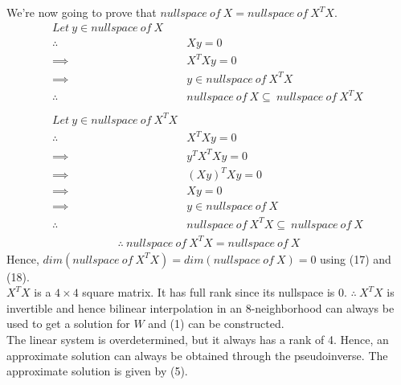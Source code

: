 \documentclass[a4paper,fleqn,11pt]{article}
\theoremstyle{mytheor}
\begin{document}
We're now going to prove that $nullspace\ of\ X = nullspace\ of\ X^TX$.
\begin{align*}
Let\ y \in nullspace\ of\ X \\
\therefore\ & Xy = 0 \\
\implies\ & X^TXy = 0 \\
\implies\ & y \in nullspace\ of\ X^TX \\
\therefore\ & nullspace\ of\ X \subseteq\ nullspace\ of\ X^TX \\
\\
Let\ y \in nullspace\ of\ X^TX \\
\therefore\ & X^TXy = 0 \\
\implies\ & y^TX^TXy = 0 \\
\implies\ & (Xy)^TXy = 0 \\
\implies\ & Xy = 0 \\
\implies\ & y \in nullspace\ of\ X \\
\therefore\ & nullspace\ of\ X^TX \subseteq\ nullspace\ of\ X\
\end{align*}
\begin{align}
\therefore\ nullspace\ of\ X^TX = nullspace\ of\ X
\end{align}
Hence, $dim(nullspace\ of\ X^TX) = dim(nullspace\ of\ X) = 0$ using (17) and (18). \\
$X^TX$ is a $4\times4$ square matrix. It has full rank since its nullspace is 0. $\therefore\ X^TX$ is invertible and hence bilinear interpolation in an 8-neighborhood can always be used to get a solution for $W$ and (1) can be constructed. \\
The linear system is overdetermined, but it always has a rank of 4. Hence, an approximate solution can always be obtained through the pseudoinverse. The approximate solution is given by (5).
\end{document}
